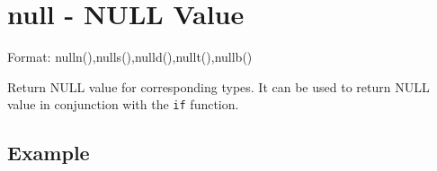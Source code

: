 
%

\section{null - NULL Value\label{sect:null}}

Format: nulln(),nulls(),nulld(),nullt(),nullb()

Return NULL value for corresponding types.  
It can be used to return NULL value in conjunction with the \verb|if| function.


\subsection*{Example}


%

